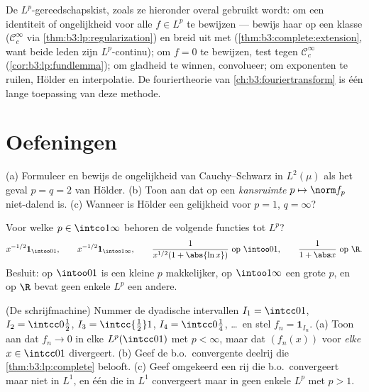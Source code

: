 \begin{method}\label{met:b3:lp:toolkit}
De $L^p$-gereedschapskist, zoals ze hieronder overal gebruikt
wordt: om een identiteit of ongelijkheid voor alle $f \in L^p$ te
bewijzen --- bewijs haar op een  klasse ($\mathcal
C_c^\infty$ via \cref{thm:b3:lp:regularization}) en breid uit met
 (\cref{thm:b3:complete:extension}, want beide leden
zijn $L^p$-continu); om $f = 0$ te bewijzen, test tegen $\mathcal
C_c^\infty$ (\cref{cor:b3:lp:fundlemma}); om gladheid te winnen,
convolueer; om exponenten te ruilen, Hölder en interpolatie. De
fouriertheorie van \cref{ch:b3:fouriertransform} is één lange
toepassing van deze methode.
\end{method}

\section{Oefeningen}

\begin{exercise}[$\star$]\label{exo:b3:lp:1}
(a) Formuleer en bewijs de ongelijkheid van Cauchy--Schwarz in
$L^2(\mu)$ als het geval $p = q = 2$ van Hölder.
(b) Toon aan dat op een \emph{kansruimte} $p \mapsto \norm f_p$
niet-dalend is.
(c) Wanneer is Hölder een gelijkheid voor $p = 1$, $q = \infty$?
\end{exercise}

\begin{exercise}[$\star$]\label{exo:b3:lp:2}
Voor welke $p \in \intco1\infty$ behoren de volgende functies tot
$L^p$?
\[
x^{-1/2}\mathbf 1_{\intoo01},\qquad
x^{-1/2}\mathbf 1_{\intoo1\infty},\qquad
\frac{1}{x^{1/2}(1 + \abs{\ln x})}\ \text{op } \intoo01,
\qquad
\frac1{1 + \abs x}\ \text{op } \R .
\]
Besluit: op $\intoo01$ is een kleine $p$ makkelijker, op
$\intoo1\infty$ een grote $p$, en op $\R$ bevat geen enkele
$L^p$ een andere.
\end{exercise}

\begin{exercise}[$\star\star$]\label{exo:b3:lp:3}
(De schrijfmachine) Nummer de dyadische intervallen $I_1 =
\intcc01$, $I_2 = \intcc0{\frac12}$, $I_3 = \intcc{\frac12}1$,
$I_4 = \intcc0{\frac14}$, \dots\ en stel $f_n = \mathbf
1_{I_n}$.
(a) Toon aan dat $f_n \to 0$ in elke $L^p(\intcc01)$ met $p <
\infty$, maar dat $(f_n(x))$ voor \emph{elke} $x \in \intcc01$
divergeert.
(b) Geef de b.o.\ convergente deelrij die
\cref{thm:b3:lp:complete} belooft.
(c) Geef omgekeerd een rij die b.o.\ convergeert maar niet in
$L^1$, en één die in $L^1$ convergeert maar in geen enkele $L^p$
met $p > 1$.
\end{exercise}

